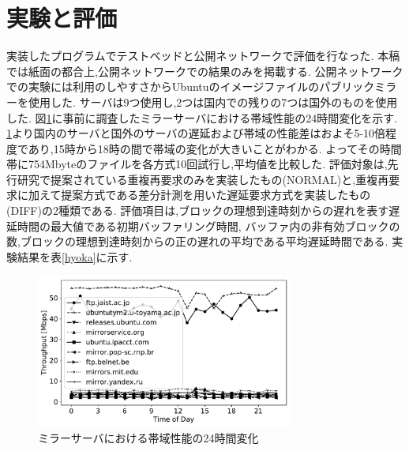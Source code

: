 \documentclass{ltjsarticle}
\begin{document}
\section{実験と評価}
\vspace{-2mm}
実装したプログラムでテストベッドと公開ネットワークで評価を行なった.
本稿では紙面の都合上,公開ネットワークでの結果のみを掲載する.
公開ネットワークでの実験には利用のしやすさからUbuntuのイメージファイルのパブリックミラーを使用した.
サーバは9つ使用し,2つは国内での残りの7つは国外のものを使用した.
図\ref{mirror}に事前に調査したミラーサーバにおける帯域性能の24時間変化を示す.
\ref{mirror}より国内のサーバと国外のサーバの遅延および帯域の性能差はおよそ5-10倍程度であり,15時から18時の間で帯域の変化が大きいことがわかる.
よってその時間帯に754Mbyteのファイルを各方式10回試行し,平均値を比較した.
評価対象は,先行研究で提案されている重複再要求のみを実装したもの(NORMAL)と,重複再要求に加えて提案方式である差分計測を用いた遅延要求方式を実装したもの(DIFF)の2種類である.
評価項目は,ブロックの理想到達時刻からの遅れを表す遅延時間の最大値である初期バッファリング時間,
バッファ内の非有効ブロックの数,ブロックの理想到達時刻からの正の遅れの平均である平均遅延時間である.
実験結果を表\ref{hyoka}に示す.
\vspace{-7mm}
\begin{table}[htb]
	\begin{center}
		\caption{実験結果}
		\label{hyoka}
		\vspace{-3mm}
	\end{center}
\end{table}
\vspace{-11mm}
\begin{figure}[h]
	\centering
	\includegraphics[width=8.5cm]{figure/thp24h-g.pdf}
	\vspace{-9mm}
	\caption{ミラーサーバにおける帯域性能の24時間変化}
	\label{mirror}
\end{figure}
\vspace{-4mm}
\end{document}
